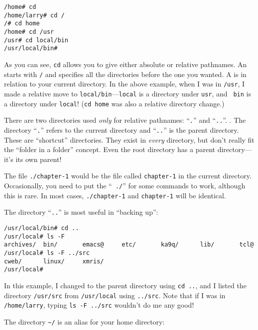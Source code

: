 \begin{screen}\begin{verbatim}
/home# cd
/home/larry# cd /
/# cd home
/home# cd /usr
/usr# cd local/bin
/usr/local/bin#
\end{verbatim}
\end{screen}

As you can see, {\tt cd} allows you to give either absolute or
relative pathnames.  An  starts with {\tt /}
and specifies all the directories before the one you wanted.  A
 is in relation to your current directory.  In
the above example, when I was in {\tt /usr}, I made a relative move to
{\tt local/bin}---{\tt local} is a directory under {\tt usr}, and {\tt
  bin} is a directory under {\tt local}!  ({\tt cd home} was also a
relative directory change.)

There are two directories used {\em only\/} for relative pathnames:
``{\tt .}'' and ``{\tt ..}''.
.  The directory ``{\tt .}'' refers
to the current directory and ``{\tt ..}'' is the parent directory.
These are ``shortcut'' directories.  They exist in {\em every\/}
directory, but don't really fit the ``folder in a folder'' concept.
Even the root directory has a parent directory---it's its own parent!

The file {\tt ./chapter-1} would be the file called {\tt chapter-1}
in the current directory.  Occasionally, you need to put the ``{\tt
  ./}'' for some commands to work, although this is rare.  In most
cases, {\tt ./chapter-1} and {\tt chapter-1} will be identical.

The directory ``{\tt ..}'' is most useful in ``backing up'':

\begin{screen}\begin{verbatim}
/usr/local/bin# cd ..
/usr/local# ls -F
archives/  bin/       emacs@     etc/       ka9q/      lib/       tcl@
/usr/local# ls -F ../src
cweb/      linux/     xmris/
/usr/local#
\end{verbatim}\end{screen}

In this example, I changed to the parent directory using {\tt cd ..},
and I listed the directory {\tt /usr/src} from {\tt /usr/local} using
{\tt ../src}. Note that if I was in {\tt /home/larry}, typing {\tt ls
  -F ../src} wouldn't do me any good!

The directory {\tt \verb+~+/} is an alias for your home
directory:

